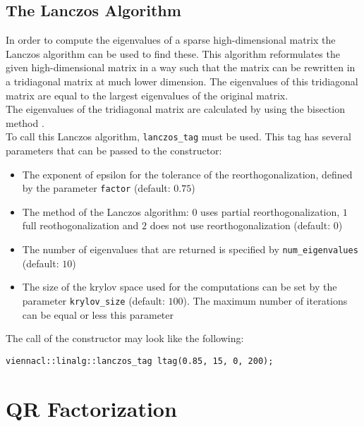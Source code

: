 
\subsection{The Lanczos Algorithm}
In order to compute the eigenvalues of a sparse high-dimensional matrix the Lanczos algorithm can be used to find these.
This algorithm reformulates the given high-dimensional matrix in a way such that the matrix can be rewritten in a tridiagonal matrix at much lower dimension.
The eigenvalues of this tridiagonal matrix are equal to the largest eigenvalues of the original matrix. \\
The eigenvalues of the tridiagonal matrix are calculated by using the bisection method \cite{golub:matrix-computations}. \\
To call this Lanczos algorithm, \lstinline|lanczos_tag| must be used.
This tag has several parameters that can be passed to the constructor:

\begin{itemize}
 \item The exponent of epsilon for the tolerance of the reorthogonalization, defined by the parameter \lstinline|factor| (default: $0.75$)
 \item The method of the Lanczos algorithm: $0$ uses partial reorthogonalization, $1$ full reothogonalization and $2$ does not use reorthogonalization (default: $0$)
 \item The number of eigenvalues that are returned is specified by \lstinline|num_eigenvalues| (default: $10$)
 \item The size of the krylov space used for the computations can be set by the parameter \lstinline|krylov_size| (default: $100$). The maximum number of iterations can be equal or less this parameter
\end{itemize}
The call of the constructor may look like the following:
\begin{lstlisting}
viennacl::linalg::lanczos_tag ltag(0.85, 15, 0, 200);
\end{lstlisting}



\section{QR Factorization}


